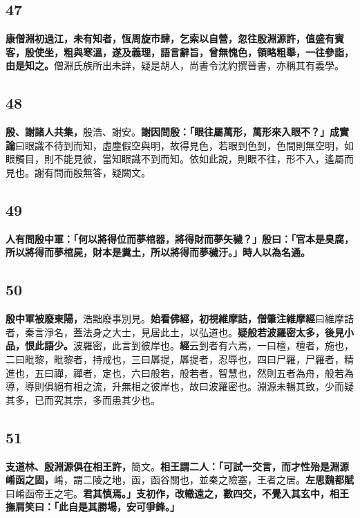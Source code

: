 \subsection*{47}

\textbf{康僧淵初過江，未有知者，恆周旋市肆，乞索以自營，忽往殷淵源許，值盛有賓客，殷使坐，粗與寒溫，遂及義理，語言辭旨，曾無愧色，領略粗舉，一往參詣，由是知之。}{\footnotesize 僧淵氏族所出未詳，疑是胡人，尚書令沈約撰晉書，亦稱其有義學。}

\subsection*{48}

\textbf{殷、謝諸人共集，}{\footnotesize 殷浩、謝安。}\textbf{謝因問殷：「眼往屬萬形，萬形來入眼不？」}{\footnotesize \textbf{成實論}曰眼識不待到而知，虛塵假空與明，故得見色，若眼到色到，色間則無空明，如眼觸目，則不能見彼，當知眼識不到而知。依如此說，則眼不往，形不入，遙屬而見也。謝有問而殷無答，疑闕文。}

\subsection*{49}

\textbf{人有問殷中軍：「何以將得位而夢棺器，將得財而夢矢穢？」殷曰：「官本是臭腐，所以將得而夢棺屍，財本是糞土，所以將得而夢穢汙。」時人以為名通。}

\subsection*{50}

\textbf{殷中軍被廢東陽，}{\footnotesize 浩黜廢事別見。}\textbf{始看佛經，初視維摩詰，}{\footnotesize \textbf{僧肇注維摩經}曰維摩詰者，秦言淨名，蓋法身之大士，見居此土，以弘道也。}\textbf{疑般若波羅密太多，後見小品，恨此語少。}{\footnotesize 波羅密，此言到彼岸也。\textbf{經}云到者有六焉，一曰檀，檀者，施也，二曰毗黎，毗黎者，持戒也，三曰羼提，羼提者，忍辱也，四曰尸羅，尸羅者，精進也，五曰禪，禪者，定也，六曰般若，般若者，智慧也，然則五者為舟，般若為導，導則俱絕有相之流，升無相之彼岸也，故曰波羅密也。淵源未暢其致，少而疑其多，已而究其宗，多而患其少也。}

\subsection*{51}

\textbf{支道林、殷淵源俱在相王許，}{\footnotesize 簡文。}\textbf{相王謂二人：「可試一交言，而才性殆是淵源崤函之固，}{\footnotesize 崤，謂二陵之地，函，函谷關也，並秦之險塞，王者之居。\textbf{左思魏都賦}曰崤函帝王之宅。}\textbf{君其慎焉。」支初作，改轍遠之，數四交，不覺入其玄中，相王撫肩笑曰：「此自是其勝場，安可爭鋒。」}

